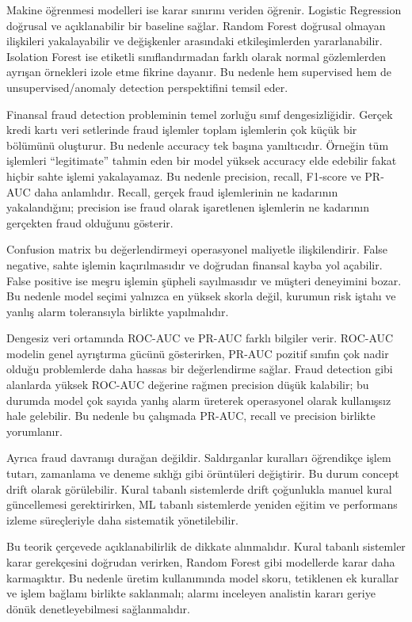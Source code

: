 \documentclass[conference]{IEEEtran}
\begin{document}
Makine öğrenmesi modelleri ise karar sınırını veriden öğrenir. Logistic Regression doğrusal ve açıklanabilir bir baseline sağlar. Random Forest doğrusal olmayan ilişkileri yakalayabilir ve değişkenler arasındaki etkileşimlerden yararlanabilir. Isolation Forest ise etiketli sınıflandırmadan farklı olarak normal gözlemlerden ayrışan örnekleri izole etme fikrine dayanır. Bu nedenle hem supervised hem de unsupervised/anomaly detection perspektifini temsil eder.

Finansal fraud detection probleminin temel zorluğu sınıf dengesizliğidir. Gerçek kredi kartı veri setlerinde fraud işlemler toplam işlemlerin çok küçük bir bölümünü oluşturur. Bu nedenle accuracy tek başına yanıltıcıdır. Örneğin tüm işlemleri ``legitimate'' tahmin eden bir model yüksek accuracy elde edebilir fakat hiçbir sahte işlemi yakalayamaz. Bu nedenle precision, recall, F1-score ve PR-AUC daha anlamlıdır. Recall, gerçek fraud işlemlerinin ne kadarının yakalandığını; precision ise fraud olarak işaretlenen işlemlerin ne kadarının gerçekten fraud olduğunu gösterir.

Confusion matrix bu değerlendirmeyi operasyonel maliyetle ilişkilendirir. False negative, sahte işlemin kaçırılmasıdır ve doğrudan finansal kayba yol açabilir. False positive ise meşru işlemin şüpheli sayılmasıdır ve müşteri deneyimini bozar. Bu nedenle model seçimi yalnızca en yüksek skorla değil, kurumun risk iştahı ve yanlış alarm toleransıyla birlikte yapılmalıdır.

Dengesiz veri ortamında ROC-AUC ve PR-AUC farklı bilgiler verir. ROC-AUC modelin genel ayrıştırma gücünü gösterirken, PR-AUC pozitif sınıfın çok nadir olduğu problemlerde daha hassas bir değerlendirme sağlar. Fraud detection gibi alanlarda yüksek ROC-AUC değerine rağmen precision düşük kalabilir; bu durumda model çok sayıda yanlış alarm üreterek operasyonel olarak kullanışsız hale gelebilir. Bu nedenle bu çalışmada PR-AUC, recall ve precision birlikte yorumlanır.

Ayrıca fraud davranışı durağan değildir. Saldırganlar kuralları öğrendikçe işlem tutarı, zamanlama ve deneme sıklığı gibi örüntüleri değiştirir. Bu durum concept drift olarak görülebilir. Kural tabanlı sistemlerde drift çoğunlukla manuel kural güncellemesi gerektirirken, ML tabanlı sistemlerde yeniden eğitim ve performans izleme süreçleriyle daha sistematik yönetilebilir.

Bu teorik çerçevede açıklanabilirlik de dikkate alınmalıdır. Kural tabanlı sistemler karar gerekçesini doğrudan verirken, Random Forest gibi modellerde karar daha karmaşıktır. Bu nedenle üretim kullanımında model skoru, tetiklenen ek kurallar ve işlem bağlamı birlikte saklanmalı; alarmı inceleyen analistin kararı geriye dönük denetleyebilmesi sağlanmalıdır.
\end{document}
